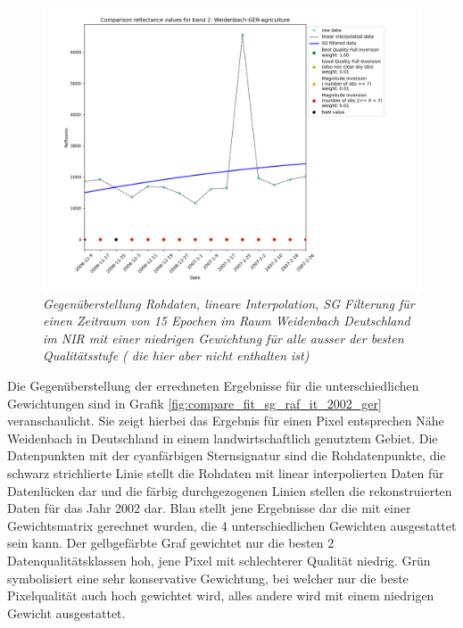 \documentclass[11pt]{report}
\begin{document}
\begin{figure}[H]

\includegraphics[scale=0.6]{./Grafiken/Fitting/Fitting_method_comparison/comparison_reflectance_values_for_2007001_band_2_Weidenbach_GER_agriculture_1_001_001_001.png}
\caption{\textit{Gegenüberstellung Rohdaten, lineare Interpolation, SG Filterung für einen Zeitraum von 15 Epochen im Raum Weidenbach Deutschland im NIR mit einer niedrigen Gewichtung für alle ausser der besten Qualitätsstufe ( die hier aber nicht enthalten ist)}}
\label{fig:compare_fit_sg_raf_it_2011_w001}
\end{figure}
Die Gegenüberstellung der errechneten Ergebnisse für die unterschiedlichen Gewichtungen sind in Grafik \ref{fig:compare_fit_sg_raf_it_2002_ger} veranschaulicht. Sie zeigt hierbei das Ergebnis für einen Pixel entsprechen Nähe Weidenbach in Deutschland in einem landwirtschaftlich genutztem Gebiet. Die Datenpunkten mit der cyanfärbigen Sternsignatur sind die Rohdatenpunkte, die schwarz strichlierte Linie stellt die Rohdaten mit linear interpolierten Daten für Datenlücken dar und die färbig durchgezogenen Linien stellen die rekonstruierten Daten für das Jahr 2002 dar. Blau stellt jene Ergebnisse dar die mit einer Gewichtsmatrix gerechnet wurden, die 4 unterschiedlichen Gewichten ausgestattet sein kann. Der gelbgefärbte Graf gewichtet nur die besten 2 Datenqualitätsklassen hoh, jene Pixel mit schlechterer Qualität niedrig. Grün symbolisiert eine sehr konservative Gewichtung, bei welcher nur die beste Pixelqualität auch hoch gewichtet wird, alles andere wird mit einem niedrigen Gewicht ausgestattet. 
\end{document}
